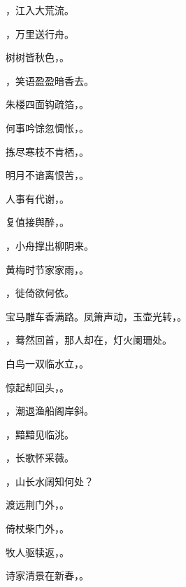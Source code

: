 \documentclass[12pt, a4paper, addpoints]{exam}
\begin{document}
\begin{questions}
\question[2] \uline{\qquad\qquad\qquad\qquad}，江入大荒流。

\question[2] \uline{\qquad\qquad\qquad\qquad}，万里送行舟。

\question[2] 树树皆秋色，\uline{\qquad\qquad\qquad\qquad}。

\question[2] \uline{\qquad\qquad\qquad\qquad}，笑语盈盈暗香去。

\question[2] 朱楼四面钩疏箔，\uline{\qquad\qquad\qquad\qquad}。

\question[2] 何事吟馀忽惆怅，\uline{\qquad\qquad\qquad\qquad}。

\question[2] 拣尽寒枝不肯栖，\uline{\qquad\qquad\qquad\qquad}。

\question[2] 明月不谙离恨苦，\uline{\qquad\qquad\qquad\qquad}。

\question[2] 人事有代谢，\uline{\qquad\qquad\qquad\qquad}。

\question[2] 复值接舆醉，\uline{\qquad\qquad\qquad\qquad}。

\question[2] \uline{\qquad\qquad\qquad\qquad}，小舟撑出柳阴来。

\question[2] 黄梅时节家家雨，\uline{\qquad\qquad\qquad\qquad}。

\question[2] \uline{\qquad\qquad\qquad\qquad}，徙倚欲何依。

\question[2] 宝马雕车香满路。凤箫声动，玉壶光转，\uline{\qquad\qquad\qquad\qquad}。

\question[2] \uline{\qquad\qquad\qquad\qquad}，蓦然回首，那人却在，灯火阑珊处。

\question[2] 白鸟一双临水立，\uline{\qquad\qquad\qquad\qquad}。

\question[2] 惊起却回头，\uline{\qquad\qquad\qquad\qquad}。

\question[2] \uline{\qquad\qquad\qquad\qquad}，潮退渔船阁岸斜。

\question[2] \uline{\qquad\qquad\qquad\qquad}，黯黯见临洮。

\question[2] \uline{\qquad\qquad\qquad\qquad}，长歌怀采薇。

\question[2] \uline{\qquad\qquad\qquad\qquad}，山长水阔知何处？

\question[2] 渡远荆门外，\uline{\qquad\qquad\qquad\qquad}。

\question[2] 倚杖柴门外，\uline{\qquad\qquad\qquad\qquad}。

\question[2] 牧人驱犊返，\uline{\qquad\qquad\qquad\qquad}。

\question[2] 诗家清景在新春，\uline{\qquad\qquad\qquad\qquad}。


\end{questions}
\end{document}
